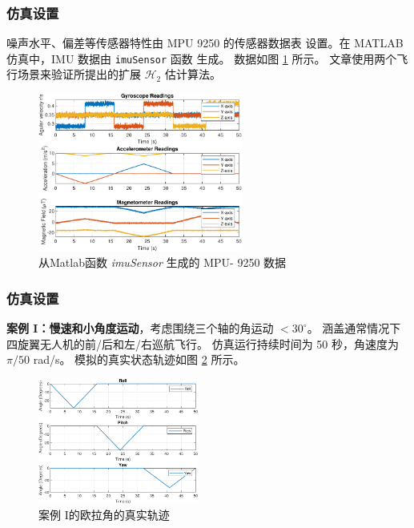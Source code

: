 \documentclass{beamer}
\begin{document}
	
		\begin{frame}
		\frametitle{仿真设置}
		噪声水平、偏差等传感器特性由 MPU 9250 的传感器数据表 \cite{MPU} 设置。在 MATLAB 仿真中，IMU 数据由 \texttt{imuSensor} 函数 \cite{MAT} 生成。 数据如图 \ref{IMU_Low} 所示。 文章使用两个飞行场景来验证所提出的扩展 $\mathcal{H}_2$ 估计算法。
		\begin{figure}[h!]
			\centering
			\includegraphics[width=0.6\textwidth]{Lowangle2.pdf}
			\caption{从Matlab函数 \textsl{imuSensor} 生成的 MPU- 9250 数据}
			\label{IMU_Low}
		\end{figure}
	\end{frame}

	\begin{frame}
	\frametitle{仿真设置}
	\textbf{案例 I：慢速和小角度运动}，考虑围绕三个轴的角运动 $< 30^{\circ}$。 涵盖通常情况下四旋翼无人机的前/后和左/右巡航飞行。 仿真运行持续时间为 50 秒，角速度为 $\pi/50$ rad/s。 模拟的真实状态轨迹如图 \ref{Tra_Low} 所示。
	\begin{figure}[h!]
		\centering
		\includegraphics[width=0.47\textwidth]{Lowangle1.pdf}
		\caption{案例 I的欧拉角的真实轨迹}
		\label{Tra_Low}
	\end{figure}
\end{frame}
\end{document}

